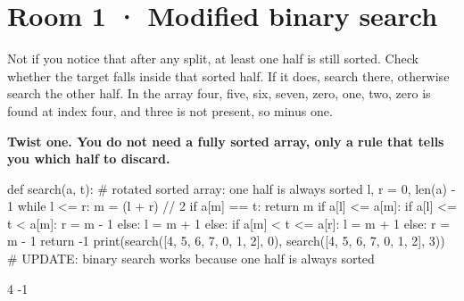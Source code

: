\documentclass[11pt,a4paper]{report}
\begin{document}
\section*{Room 1 · Modified binary search}
Not if you notice that after any split, at least one half is still sorted. Check whether the target falls inside that sorted half. If it does, search there, otherwise search the other half. In the array four, five, six, seven, zero, one, two, zero is found at index four, and three is not present, so minus one.
\begin{tcolorbox}[colback=yellow!12,colframe=orange!70!black,boxrule=0.4pt,left=4pt,right=4pt,top=2pt,bottom=2pt]\textbf{Twist one. You do not need a fully sorted array, only a rule that tells you which half to discard.}\end{tcolorbox}
\begin{Code}
def search(a, t):                           # rotated sorted array: one half is always sorted
    l, r = 0, len(a) - 1
    while l <= r:
        m = (l + r) // 2
        if a[m] == t: return m
        if a[l] <= a[m]:
            if a[l] <= t < a[m]: r = m - 1
            else: l = m + 1
        else:
            if a[m] < t <= a[r]: l = m + 1
            else: r = m - 1
    return -1
print(search([4, 5, 6, 7, 0, 1, 2], 0), search([4, 5, 6, 7, 0, 1, 2], 3))
# UPDATE: binary search works because one half is always sorted
\end{Code}
\begin{Out}
4 -1
\end{Out}
\end{document}
